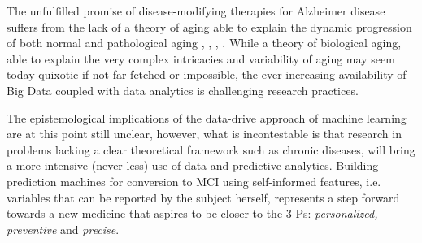 \documentclass[preprint,12pt]{elsarticle}
\begin{document}
The unfulfilled promise of disease-modifying therapies for Alzheimer disease suffers from the lack of a theory of aging able to explain the dynamic progression of both normal and pathological aging \cite{cerella1985information}, \cite{mangel2001complex}, \cite{sleimen2014aging}, \cite{cohen2016complex}.
While a theory of biological aging, able to explain the very complex intricacies and variability of aging may seem today quixotic if not far-fetched or impossible, the ever-increasing availability of Big Data coupled with data analytics is challenging research practices. 

The epistemological implications of the data-drive approach of machine learning are at this point still unclear, however, what is incontestable is that research in problems lacking a clear theoretical framework such as chronic diseases, will bring a more intensive (never less) use of data and predictive analytics. Building prediction machines for conversion to MCI using self-informed features, i.e. variables that can be reported by the subject herself, represents a step forward towards a new medicine that aspires to be closer to the 3 Ps: \emph{personalized, preventive} and \emph{precise}. 










\end{document}

